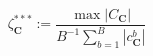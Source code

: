 \begin{equation}
 \zeta_\textbf{C}^{***} := \frac{\max \left|C_\textbf{C}\right|}{B^{-1} \sum_{b=1}^B{\left|c_\textbf{C}^b\right|}}
 \label{ch1:equ:peak-to-average}
\end{equation}